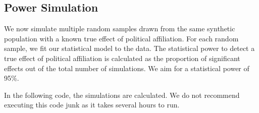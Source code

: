 \documentclass[
  letterpaper,
  DIV=11,
  numbers=noendperiod]{scrartcl}
\begin{document}
\subsection{Power Simulation}\label{power-simulation}

We now simulate multiple random samples drawn from the same synthetic
population with a known true effect of political affiliation. For each
random sample, we fit our statistical model to the data. The statistical
power to detect a true effect of political affiliation is calculated as
the proportion of significant effects out of the total number of
simulations. We aim for a statistical power of 95\%.

In the following code, the simulations are calculated. We do not
recommend executing this code junk as it takes several hours to run.
\end{document}
